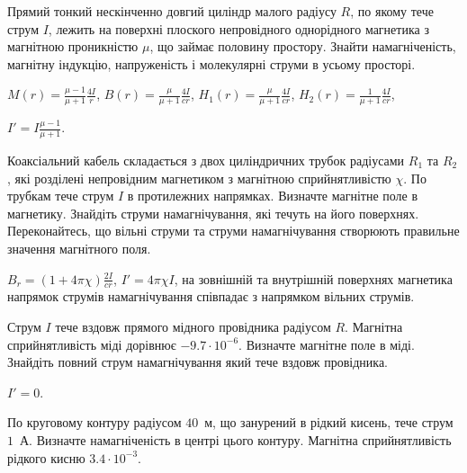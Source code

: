 \begin{problem}\label{prb:wire_on_bound}
Прямий тонкий нескінченно довгий циліндр малого радіусу $R$, по якому тече струм $I$, лежить на поверхні плоского непровідного однорідного магнетика з магнітною проникністю $\mu$, що займає половину простору. Знайти намагніченість, магнітну індукцію, напруженість і молекулярні струми в усьому просторі.
\begin{solution}
	$M(r) = \frac{\mu - 1}{\mu + 1}\frac{4I}{r}$,
	$B(r) = \frac{\mu}{\mu + 1}\frac{4I}{cr}$,
	$H_1(r) = \frac{\mu}{\mu + 1}\frac{4I}{cr}$,
	$H_2(r) = \frac{1}{\mu + 1}\frac{4I}{cr}$,

	$I' = I \frac{\mu - 1}{\mu + 1}$.
\end{solution}
\end{problem}

\begin{problem}
Коаксіальний кабель складається з двох циліндричних трубок радіусами $R_1$ та $R_2$, які розділені непровідним магнетиком з магнітною сприйнятливістю $\chi$. По трубкам тече струм $I$ в протилежних напрямках. Визначте магнітне поле в магнетику. Знайдіть струми намагнічування, які течуть на його поверхнях. Переконайтесь, що вільні струми та струми намагнічування створюють правильне значення магнітного поля.
\begin{solution}
	$B_r = (1 + 4\pi\chi)\frac{2I}{cr}$, $I'  = 4\pi\chi I$, на зовнішній та внутрішній поверхнях магнетика напрямок струмів намагнічування співпадає з напрямком вільних струмів.
\end{solution}
\end{problem}

\begin{problem} %
Струм $I$ тече вздовж прямого мідного провідника радіусом $R$. Магнітна сприйнятливість міді дорівнює $-9.7\cdot 10^{-6}$. Визначте магнітне поле в міді. Знайдіть повний струм намагнічування який тече вздовж провідника.
\begin{solution}
	$I' = 0$.
\end{solution}
\end{problem}

\begin{problem}
    По круговому контуру радіусом $40$~м, що занурений в рідкий кисень, тече струм $1$~А. Визначте намагніченість в центрі цього контуру. Магнітна сприйнятливість рідкого кисню $3.4\cdot 10^{-3}$.
\end{problem}

